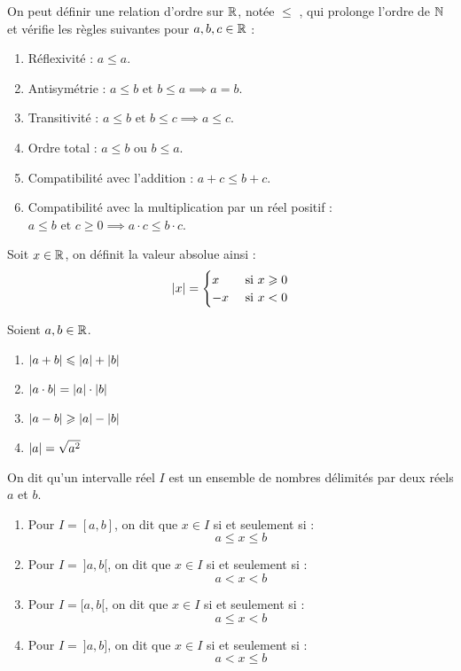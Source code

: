 \begin{proposition}
    On peut définir une relation d'ordre sur $\mathbb{R}$, notée \og $\leq$ \fg, qui prolonge l'ordre de $\mathbb{N}$ et vérifie les règles suivantes pour $a, b, c \in \mathbb{R}$ :
    \begin{enumerate}
        \item Réflexivité : $a \leq a$.
        \item Antisymétrie : $a \leq b \text{ et } b \leq a \implies a = b$.
        \item Transitivité : $a \leq b \text{ et } b \leq c \implies a \leq c$.
        \item Ordre total : $a \leq b \text{ ou } b \leq a$.
        \item Compatibilité avec l'addition : $a + c \leq b + c$.
        \item Compatibilité avec la multiplication par un réel positif : $a \leq b \text{ et } c \geq 0 \implies a \cdot c \leq b \cdot c$.
    \end{enumerate}
\end{proposition}

\begin{definition}
    Soit $x \in \mathbb{R}$, on définit la valeur absolue ainsi :
    \begin{align*}
        \abs{x} =
        \begin{cases}
            x &\text{ si } x \geqslant 0 \\
            -x &\text{ si } x < 0
        \end{cases}
    \end{align*}
\end{definition}

\begin{proposition}
   	Soient $a, b \in \mathbb{R}$.
    \begin{enumerate}
            \item $\abs{a + b} \leqslant \abs{a} + \abs{b}$
            \item $\abs{a \cdot b} = \abs{a} \cdot \abs{b}$
            \item $\abs{a - b} \geqslant \abs{a} - \abs{b}$
            \item $\abs{a} = \sqrt{a^2}$
        \end{enumerate}
\end{proposition}

\begin{definition}
    On dit qu'un intervalle réel $I$ est un ensemble de nombres délimités par deux réels $a$ et $b$.
    \begin{enumerate}
    	\item Pour $I = [a, b]$, on dit que $x \in I$ si et seulement si :
    	\[ a \leq x \leq b \]
    	\item Pour $I = \ ]a, b[$, on dit que $x \in I$ si et seulement si :
    	\[ a < x < b \]
    	\item Pour $I = [a, b[$, on dit que $x \in I$ si et seulement si : 
    	\[ a \leq x < b \]
    	\item Pour $I = \ ]a, b]$, on dit que $x \in I$ si et seulement si :
    	\[ a < x \leq b \]
    \end{enumerate}
\end{definition}

